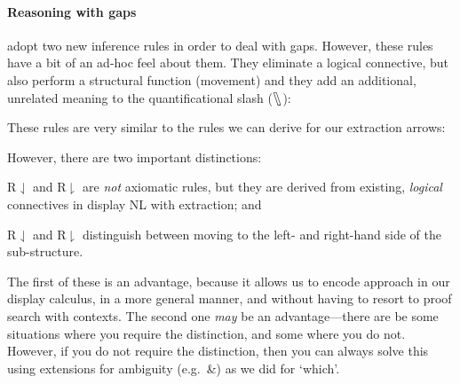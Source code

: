 \paragraph*{Reasoning with gaps}
\citet[][chapter 17.10]{barker2015} adopt two new inference rules in
order to deal with gaps. However, these rules have a bit of an ad-hoc
feel about them. They eliminate a logical connective, but also
perform a structural function (movement) and they add an additional,
unrelated meaning to the quantificational slash ($\fatbslash$):
\begin{center}
  \begin{pfbox}
  \end{pfbox}
  \begin{pfbox}
  \end{pfbox}
\end{center}
These rules are very similar to the rules we can derive for our
extraction arrows:
\begin{center}
  \begin{pfbox}
  \end{pfbox}
  \begin{pfbox}
  \end{pfbox}
\end{center}
However, there are two important distinctions:
\begin{enumerate*}[label=(\arabic*)]
\item R${\downharpoonleft}$ and R${\downharpoonright}$ are \emph{not}
  axiomatic rules, but they are derived from existing, \emph{logical}
  connectives in display NL with extraction; and
\item R${\downharpoonleft}$ and R${\downharpoonright}$ distinguish
  between moving to the left- and right-hand side of the
  sub-structure.
\end{enumerate*}
The first of these is an advantage, because it allows us to encode
 approach in our display calculus, in a more
general manner, and without having to resort to proof search with
contexts. The second one \emph{may} be an advantage---there are be
some situations where you require the distinction, and some where you
do not. However, if you do not require the distinction, then you can
always solve this using extensions for ambiguity (e.g.\ \&) as we did
for `which'.

